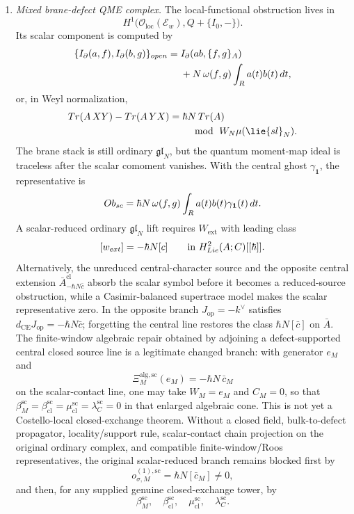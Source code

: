 \begin{enumerate}
  \item \emph{Mixed brane-defect QME complex.}
  The local-functional obstruction lives in
  \[
    H^1\bigl(\mathcal O_{\mathrm{loc}}(\mathcal E_w),
      Q+\{I_0,-\}\bigr).
  \]
  Its scalar component is computed by
  \[
    \begin{aligned}
    \{I_\partial(a,f),I_\partial(b,g)\}_{open}
    ={}&
    I_\partial(ab,\{f,g\}_{A})\\
    &+N\,\omega(f,g)\int_{R} a(t)b(t)\,dt ,
    \end{aligned}
  \]
  or, in Weyl normalization,
  \[
    \begin{aligned}
    \operatorname{Tr}(A\,XY)-\operatorname{Tr}(A\,YX)
      ={}&\hbar N\,\operatorname{Tr}(A)\\
      &\quad\bmod\ \mathcal W_N\widehat\mu(\lie{sl}_N).
    \end{aligned}
  \]
	  The brane stack is still ordinary \(\mathfrak{gl}_N\), but the quantum
	  moment-map ideal is traceless after the scalar comoment vanishes.
  With the central ghost \(\gamma_{\mathbf 1}\), the representative is
  \[
    Ob_{sc}
    =
    \hbar N\,\omega(f,g)
    \int_{R} a(t)b(t)\gamma_{\mathbf 1}(t)\,dt .
  \]
	  A scalar-reduced ordinary \(\mathfrak{gl}_N\) lift requires
	  \(W_{\mathrm{ext}}\) with leading class
	  \[
	    [w_{ext}]=-\hbar N[c]
	    \qquad\text{in }H^2_{Lie}(A;C)[[\hbar]].
	  \]
	  Alternatively, the unreduced central-character source and the opposite
	  central extension
	  \(\bar A^{\mathrm{cl}}_{-\hbar N\bar c}\) absorb the scalar symbol
	  before it becomes a reduced-source obstruction, while a
	  Casimir-balanced supertrace model makes the scalar representative
	  zero.  In the opposite branch
	  \(J_{\mathrm{op}}=-k^\vee\) satisfies
	  \(d_{\mathrm{CE}}J_{\mathrm{op}}=-\hbar N\bar c\); forgetting the
	  central line restores the class \(\hbar N[\bar c]\) on \(\bar A\).
	  The finite-window algebraic repair obtained by adjoining a
	  defect-supported central closed source line is a legitimate changed
	  branch: with generator \(e_M\) and
	  \[
	    \Xi^{\mathrm{alg},\mathrm{sc}}_M(e_M)
	    =
	    -\hbar N\,\bar c_M
	  \]
	  on the scalar-contact line, one may take \(W_M=e_M\) and \(C_M=0\),
	  so that
	  \(\beta^{\mathrm{sc}}_M=\beta^{\mathrm{sc}}_{\mathrm{cl}}
	  =\mu^{\mathrm{sc}}_{\mathrm{cl}}
	  =\lambda^{\mathrm{sc}}_C=0\) in that enlarged algebraic cone.  This
	  is not yet a Costello-local closed-exchange theorem.  Without a
	  closed field, bulk-to-defect propagator, locality/support rule,
	  scalar-contact chain projection on the original ordinary complex,
	  and compatible finite-window/Roos representatives, the original
	  scalar-reduced branch remains blocked first by
	  \[
	    o_{\sigma,M}^{(1),\mathrm{sc}}
	    =
	    \hbar N[\bar c_M]\neq0,
	  \]
	  and then, for any supplied genuine closed-exchange tower, by
	  \[
	    \beta^{\mathrm{sc}}_M,\quad
	    \beta^{\mathrm{sc}}_{\mathrm{cl}},\quad
	    \mu^{\mathrm{sc}}_{\mathrm{cl}},\quad
	    \lambda^{\mathrm{sc}}_C .
	  \]


\end{enumerate}
